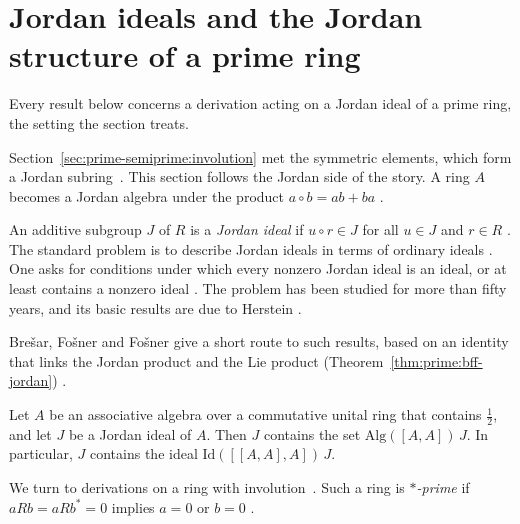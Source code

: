 \section{Jordan ideals and the Jordan structure of a prime ring}\label{sec:prime-semiprime:jordan-ideals}

Every result below concerns a derivation acting on a Jordan ideal of a prime
ring, the setting the section treats. %

Section~\ref{sec:prime-semiprime:involution} met the symmetric elements, which
form a Jordan subring~\cite[p.~1]{BresarFosnerFosner2005}. This section follows the Jordan side of the story. A
ring $A$ becomes a Jordan algebra under the product $a\circ b=ab+ba$
\cite[p.~1]{BresarFosnerFosner2005}.

An additive subgroup $J$ of $R$ is a \emph{Jordan ideal} if $u\circ r\in J$
for all $u\in J$ and $r\in R$ \cite[p.~415]{Oukhtite2011}. The standard
problem is to describe Jordan ideals in terms of ordinary ideals
\cite[p.~1]{BresarFosnerFosner2005}. One asks for conditions under which every
nonzero Jordan ideal is an ideal, or at least contains a nonzero ideal
\cite[p.~1]{BresarFosnerFosner2005}. The problem has been studied for more
than fifty years, and its basic results are due to Herstein
\cite[p.~1]{BresarFosnerFosner2005}.

Bre\v{s}ar, Fo\v{s}ner and Fo\v{s}ner give a short route to such results, based on
an identity that links the Jordan product and the Lie product (Theorem~\ref{thm:prime:bff-jordan})
\cite[p.~1]{BresarFosnerFosner2005}.\begin{theorem}\label{thm:prime:bff-jordan}
Let $A$ be an associative algebra over a commutative unital ring that contains
$\tfrac12$, and let $J$ be a Jordan ideal of $A$. Then $J$ contains the set
$\mathrm{Alg}([A,A])\,J$. In particular, $J$ contains the ideal
$\mathrm{Id}([[A,A],A])\,J$.
\end{theorem}

We turn to derivations on a ring with involution~\cite[p.~415]{Oukhtite2011}. Such a ring is
\emph{$*$-prime} if $aRb=aRb^*=0$ implies $a=0$ or $b=0$
\cite[p.~415]{Oukhtite2011}.

